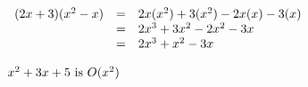 \documentclass{article}
\begin{document}
    \vspace{5mm}
    \begin{math}
        \begin{array}{r c l}
            (2x + 3)(x^{2} - x) & = & 2x(x^{2}) + 3(x^{2}) - 2x(x) - 3(x) \\
                                & = & 2x^{3} + 3x^{2} - 2x^{2} - 3x \\
                                & = & 2x^{3} + x^{2} - 3x \\
        \end{array}
    \end{math}

    \vspace{5mm}
    \begin{math}
        x^{2} + 3x + 5 \textnormal{ is } O(x^{2})
    \end{math}

\end{document}
